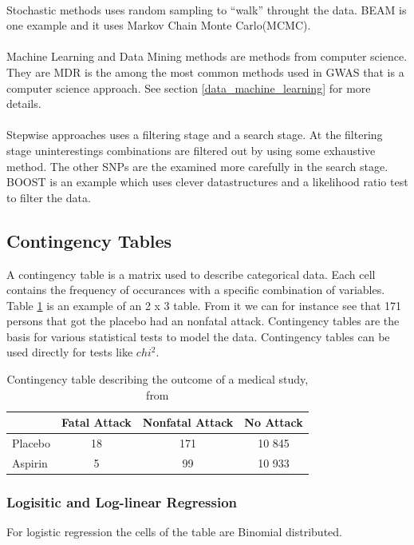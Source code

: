 \documentclass[10pt,a4paper]{article}
\begin{document}
\\
Stochastic methods uses random sampling to ``walk'' throught the data. BEAM\cite{beam_2007} is one example and it uses Markov Chain Monte Carlo(MCMC).\\
\\
Machine Learning and Data Mining methods are methods from computer science. They are %
MDR\cite{mdr_2001} is the among the most common methods used in GWAS that is a computer science approach. See section \ref{data_machine_learning} for more details.\\
\\
Stepwise approaches uses a filtering stage and a search stage. At the filtering stage uninterestings combinations are filtered out by using some exhaustive method. The other SNPs are the examined more carefully in the search stage. BOOST\cite{boost_gene_gene} is an example which uses clever datastructures and a likelihood ratio test to filter the data.

\subsection{Contingency Tables}
A contingency table is a matrix used to describe categorical data. Each cell contains the frequency of occurances with a specific combination of variables. Table \ref{table:contingency_table} is an example of an 2 x 3 table. From it we can for instance see that 171 persons that got the placebo had an nonfatal attack. Contingency tables are the basis for various statistical tests to model the data. Contingency tables can be used directly for tests like $chi^2$. \cite{agresti_categorical}

\begin{table}[h]
\begin{tabular}{ l c c c }
  \hline
  & Fatal Attack & Nonfatal Attack & No Attack\\
  \hline
  Placebo & 18 & 171 & 10 845 \\
  Aspirin & 5 & 99 & 10 933 \\
  \hline  
\end{tabular}
\caption{Contingency table describing the outcome of a medical study, from \cite{agresti_categorical}}
\label{table:contingency_table}
\end{table}

\subsubsection{Logisitic and Log-linear Regression}
For logistic regression the cells of the table are Binomial distributed.\cite{agresti_categorical}
\end{document}
